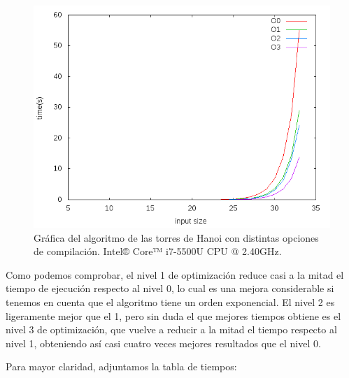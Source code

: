 \documentclass[11pt,a4paper]{article}
\begin{document}
				\begin{figure}[h]

					\centering
					\includegraphics[width=1\textwidth]{hanoi_opt.png}
					\caption{Gráfica del algoritmo de las torres de Hanoi con distintas opciones de compilación. Intel® Core™ i7-5500U CPU @ 2.40GHz.}

				\end{figure}

				\par
				Como podemos comprobar, el nivel 1 de optimización reduce casi a la mitad el tiempo de ejecución respecto al nivel 0, lo cual es una mejora considerable si tenemos en cuenta que el algoritmo tiene un orden exponencial. El nivel 2 es ligeramente mejor que el 1, pero sin duda el que mejores tiempos obtiene es el nivel 3 de optimización, que vuelve a reducir a la mitad el tiempo respecto al nivel 1, obteniendo así casi cuatro veces mejores resultados que el nivel 0.

\newpage

				\par
				Para mayor claridad, adjuntamos la tabla de tiempos:
\end{document}
